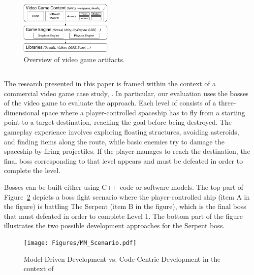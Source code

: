 \begin{figure}[h]
    \centering
    \includegraphics[width=0.4\textwidth]{Figures/fig_bg_OverviewArtifactsVG.pdf}
    \caption{Overview of video game artifacts.}
    \label{fig:architecture}
\end{figure}

\subsection{\CaseStudy{}}

The research presented in this paper is framed within the context of a commercial video game case study, \CaseStudy{}. In particular, our evaluation uses the bosses of the video game to evaluate the approach. Each level of \CaseStudy{} consists of a three-dimensional space where a player-controlled spaceship has to fly from a starting point to a target destination, reaching the goal before being destroyed. The gameplay experience involves exploring floating structures, avoiding asteroids, and finding items along the route, while basic enemies try to damage the spaceship by firing projectiles. If the player manages to reach the destination, the final boss corresponding to that level appears and must be defeated in order to complete the level. 

Bosses can be built either using C++ code or software models. The top part of Figure~\ref{fig:scenario} depicts a boss fight scenario where the player-controlled ship (item A in the figure) is battling The Serpent (item B in the figure), which is the final boss that must defeated in order to complete Level 1. The bottom part of the figure illustrates the two possible development approaches for the Serpent boss.

\begin{figure}[h]
    \centering
    \texttt{[image: Figures/MM\_Scenario.pdf]}
    \caption{Model-Driven Development vs. Code-Centric Development in the context of \CaseStudy{}}
    \label{fig:scenario}
\end{figure}

